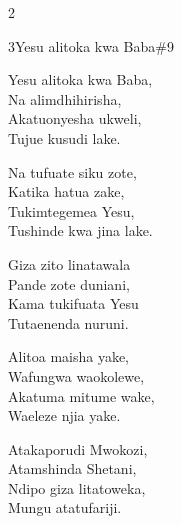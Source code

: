 \documentclass{article}
\begin{document}
\begin{multicols}{2}
\begin{hymn}{3}{Yesu alitoka kwa Baba}{\#9}
\begin{stanza}
Yesu alitoka kwa Baba,\\
Na alimdhihirisha,\\
Akatuonyesha ukweli,\\
Tujue kusudi lake.
\end{stanza}
\begin{chorus}
Na tufuate siku zote,\\
Katika hatua zake,\\
Tukimtegemea Yesu,\\
Tushinde kwa jina lake.
\end{chorus}
\begin{stanza}
Giza zito linatawala\\
Pande zote duniani,\\
Kama tukifuata Yesu\\
Tutaenenda nuruni.
\end{stanza}
\begin{stanza}
Alitoa maisha yake,\\
Wafungwa waokolewe,\\
Akatuma mitume wake,\\
Waeleze njia yake.
\end{stanza}
\begin{stanza}
Atakaporudi Mwokozi,\\
Atamshinda Shetani,\\
Ndipo giza litatoweka,\\
Mungu atatufariji.
\end{stanza}
\end{hymn}


\end{multicols}
\end{document}

